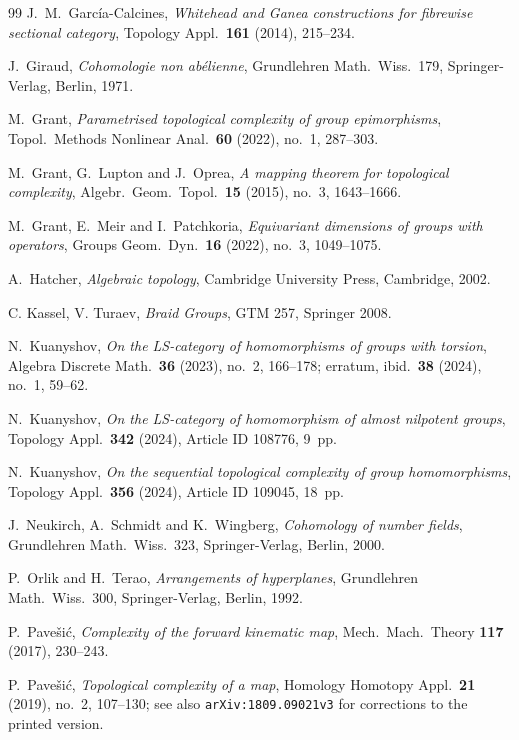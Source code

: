\documentclass[11pt]{amsart}
\theoremstyle{plain}
\theoremstyle{definition}
\begin{document}
\begin{thebibliography}{99}
J.~M.~Garc\'ia-Calcines,
\emph{Whitehead and Ganea constructions for fibrewise sectional category},
Topology Appl.\ \textbf{161} (2014), 215--234.

J.~Giraud, \emph{Cohomologie non ab\'elienne},
Grundlehren Math.\ Wiss.\ 179, Springer-Verlag, Berlin, 1971.

M.~Grant,
\emph{Parametrised topological complexity of group epimorphisms},
Topol.\ Methods Nonlinear Anal.\ \textbf{60} (2022), no.~1, 287--303.

M.~Grant, G.~Lupton and J.~Oprea,
\emph{A mapping theorem for topological complexity},
Algebr.\ Geom.\ Topol.\ \textbf{15} (2015), no.~3, 1643--1666.

M.~Grant, E.~Meir and I.~Patchkoria,
\emph{Equivariant dimensions of groups with operators},
Groups Geom.\ Dyn.\ \textbf{16} (2022), no.~3, 1049--1075.

A.~Hatcher, \emph{Algebraic topology},
Cambridge University Press, Cambridge, 2002.

C. Kassel, V. Turaev, \emph{Braid Groups}, GTM 257, Springer 2008.

N.~Kuanyshov,
\emph{On the LS-category of homomorphisms of groups with torsion},
Algebra Discrete Math.\ \textbf{36} (2023), no.~2, 166--178;
erratum, ibid.\ \textbf{38} (2024), no.~1, 59--62.

N.~Kuanyshov,
\emph{On the LS-category of homomorphism of almost nilpotent groups},
Topology Appl.\ \textbf{342} (2024), Article ID 108776, 9~pp.

N.~Kuanyshov,
\emph{On the sequential topological complexity of group homomorphisms},
Topology Appl.\ \textbf{356} (2024), Article ID 109045, 18~pp.

J.~Neukirch, A.~Schmidt and K.~Wingberg,
\emph{Cohomology of number fields},
Grundlehren Math.\ Wiss.\ 323, Springer-Verlag, Berlin, 2000.

P.~Orlik and H.~Terao, \emph{Arrangements of hyperplanes},
Grundlehren Math.\ Wiss.\ 300, Springer-Verlag, Berlin, 1992.

P.~Pave\v si\'c, \emph{Complexity of the forward kinematic map},
Mech.\ Mach.\ Theory \textbf{117} (2017), 230--243.

P.~Pave\v si\'c, \emph{Topological complexity of a map},
Homology Homotopy Appl.\ \textbf{21} (2019), no.~2, 107--130;
see also \texttt{arXiv:1809.09021v3} for corrections to the printed version.


\end{thebibliography}
\end{document}
